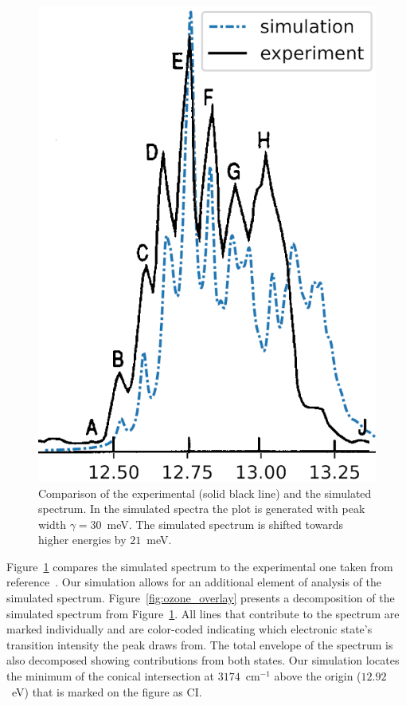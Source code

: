 \documentclass[
12pt,
a4paper,
prb,
superscriptaddress,
tightenlines,  %
]{revtex4}
\begin{document}
\begin{figure}
\includegraphics[width = 8 cm]{figures/sim_vs_Dyke}
\caption{
    Comparison of the experimental (solid black line) and the simulated
    spectrum. In the simulated spectra the plot is generated with peak width
    $\gamma = 30$~meV. The simulated spectrum is shifted towards higher
    energies by $21$~meV.
}
\label{fig:sim_vs_dyke}
\end{figure}

Figure~\ref{fig:sim_vs_dyke} compares the simulated spectrum to the
experimental one taken from reference~\cite{dyke:O3:74}. Our simulation allows
for an additional element of analysis of the simulated spectrum.
Figure~\ref{fig:ozone_overlay} presents a decomposition of the simulated
spectrum from Figure~\ref{fig:sim_vs_dyke}. All lines that contribute to the
spectrum are marked individually and are color-coded indicating which
electronic state's transition intensity the peak draws from. The total
envelope of the spectrum is also decomposed showing contributions from both
states. Our simulation locates the minimum of the conical intersection at
$3174$~cm$^{-1}$ above the origin ($12.92$~eV) that is marked on the figure as
CI.
\end{document}
